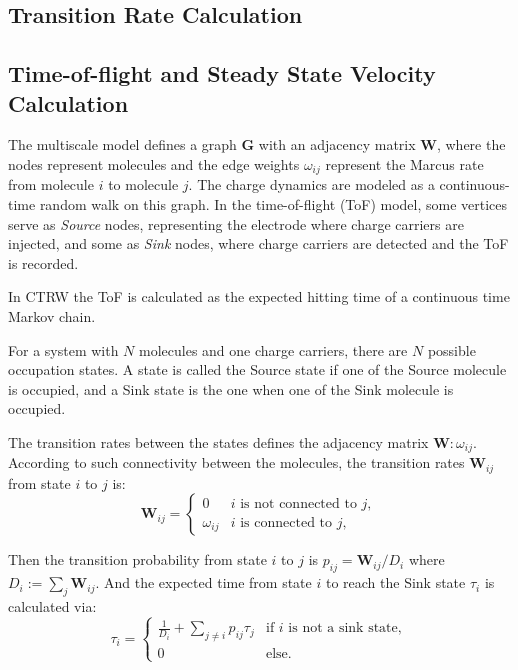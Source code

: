\documentclass[letterpaper,12pt]{article}
\begin{document}
\subsection{Transition Rate Calculation}

\subsection{Time-of-flight and Steady State Velocity Calculation}
The multiscale model defines a graph $\mathbf{G}$ with an adjacency matrix $\mathbf{W}$, where the nodes represent molecules and the edge weights $\omega_{ij}$ represent the Marcus rate from molecule $i$ to molecule $j$. 
The charge dynamics are modeled as a continuous-time random walk on this graph. In the time-of-flight (ToF) model, some vertices serve as \textit{Source} nodes, representing the electrode where charge carriers are injected, and some as \textit{Sink} nodes, where charge carriers are detected and the ToF is recorded.

In CTRW the ToF is calculated as the expected hitting time of a continuous time Markov chain.

For a system with $N$ molecules and one charge carriers, there are $N$ possible occupation states. A state is called the Source state if one of the Source molecule is occupied, and a Sink state is the one when one of the Sink molecule is occupied.

The transition rates between the states defines the adjacency matrix $\mathbf{W}:\omega_{ij}$.
According to such connectivity between the molecules, the transition rates $\mathbf{W}_{ij}$ from state $i$ to $j$ is:
\begin{equation}\label{eq:transition_rates}
	\mathbf{W}_{ij} =
	\begin{cases}
	     0			&  i \text{ is not connected to } j,\\
         \omega_{ij}   &  i \text{ is connected to } j,
	\end{cases}
\end{equation}

Then the transition probability from state $i$ to $j$ is $p_{ij} = \mathbf{W}_{ij}/D_i$ where $D_i := \sum_{j} \mathbf{W}_{ij}$.
And the expected time from state $i$ to reach the Sink state $\tau_i$ is calculated via: 
\begin{equation}\label{eq:hitting_time}
	\tau_i = \begin{cases}
		\frac{1}{D_i} + \sum_{j \ne i} p_{ij} \tau_{j} &\text{if $i$ is not a sink state},\\
		0 &\text{else.} 
	\end{cases}
\end{equation} 
\end{document}
